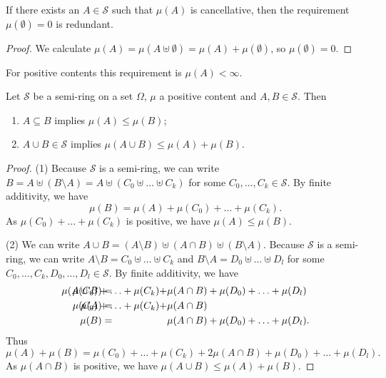\begin{lemma} \label{emptysetNullset}
If there exists an $A\in \mathcal{S}$ such that $\mu(A)$ is cancellative, then the requirement $\mu(\emptyset) = 0$ is redundant.
\end{lemma}
\begin{proof}
We calculate $\mu(A) = \mu(A \uplus \emptyset) = \mu(A) + \mu(\emptyset)$, so $\mu(\emptyset) = 0$.
\end{proof}
For positive contents this requirement is $\mu(A) < \infty$.

\begin{proposition} \label{semiringPositiveContent}
Let $\mathcal{S}$ be a semi-ring on a set $\Omega$, $\mu$ a positive content and $A,B\in \mathcal{S}$. Then
\begin{enumerate}
\item $A\subseteq B$ implies $\mu(A) \leq \mu(B)$;
\item $A\cup B\in\mathcal{S}$ implies $\mu(A \cup B) \leq \mu(A) + \mu(B)$.
\end{enumerate}
\end{proposition}
\begin{proof}
(1) Because $\mathcal{S}$ is a semi-ring, we can write $B = A \uplus (B\setminus A) = A \uplus (C_0 \uplus \ldots \uplus C_k)$ for some $C_0,\ldots, C_k\in\mathcal{S}$. By finite additivity, we have
\[ \mu(B) = \mu(A) + \mu(C_0) + \ldots + \mu(C_k). \]
As $\mu(C_0) + \ldots + \mu(C_k)$ is positive, we have $\mu(A) \leq \mu(B)$.

(2) We can write $A\cup B = (A\setminus B) \uplus (A\cap B) \uplus (B\setminus A)$. Because $\mathcal{S}$ is a semi-ring, we can write $A\setminus B = C_0 \uplus \ldots \uplus C_k$ and $B\setminus A = D_0 \uplus \ldots \uplus D_l$ for some $C_0,\ldots, C_k, D_0,\ldots, D_l\in\mathcal{S}$. By finite additivity, we have
\begin{align*}
\mu(A\cup B) &= & \hspace{-5em} \mu(C_0) + \ldots + \mu(C_k) + &\mu(A\cap B) + \mu(D_0) + \ldots + \mu(D_l) \\
\mu(A) &= & \hspace{-5em} \mu(C_0) + \ldots + \mu(C_k) + &\mu(A\cap B) \\
\mu(B) &= & &\mu(A\cap B) + \mu(D_0) + \ldots + \mu(D_l).
\end{align*}
Thus
\[ \mu(A)+\mu(B) = \mu(C_0) + \ldots + \mu(C_k) + 2\mu(A\cap B) + \mu(D_0) + \ldots + \mu(D_l). \]
As $\mu(A\cap B)$ is positive, we have $\mu(A\cup B) \leq \mu(A)+\mu(B)$.
\end{proof}

